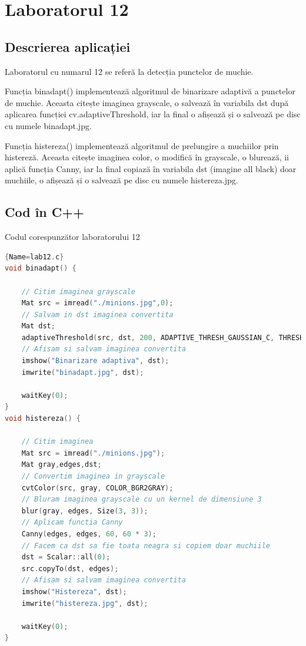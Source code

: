 \documentclass{amsart}
\begin{document}
\newpage
\section{Laboratorul 12}

\subsection{Descrierea aplicației}
\par
Laboratorul cu numarul 12 se referă la detecția punctelor de muchie.
\\ \par
Funcția binadapt() implementează algoritmul de binarizare adaptivă a punctelor de muchie. Aceasta citește imaginea grayscale, o salvează în variabila dst după aplicarea funcției cv.adaptiveThreshold, iar la final o afișează și o salvează pe disc cu numele binadapt.jpg.
\\ \par
Funcția histereza() implementează algoritmul de prelungire a muchiilor prin histereză. Aceasta citește imaginea color, o modifică în grayscale, o blurează, ii aplică funcția Canny, iar la final copiază în variabila dst (imagine all black) doar muchiile, o afișează și o salvează pe disc cu numele histereza.jpg.

\subsection{Cod \^{i}n C++}

Codul corespunzător laboratorului 12

\begin{lstlisting}[language=C++]{Name=lab12.c}
void binadapt() {

	// Citim imaginea grayscale
	Mat src = imread("./minions.jpg",0);
	// Salvam in dst imaginea convertita
	Mat dst;
	adaptiveThreshold(src, dst, 200, ADAPTIVE_THRESH_GAUSSIAN_C, THRESH_BINARY, 3, 2);
	// Afisam si salvam imaginea convertita
	imshow("Binarizare adaptiva", dst);
	imwrite("binadapt.jpg", dst);

	waitKey(0);
}
void histereza() {

	// Citim imaginea
	Mat src = imread("./minions.jpg");
	Mat gray,edges,dst;
	// Convertim imaginea in grayscale
	cvtColor(src, gray, COLOR_BGR2GRAY);
	// Bluram imaginea grayscale cu un kernel de dimensiune 3
	blur(gray, edges, Size(3, 3));
	// Aplicam functia Canny
	Canny(edges, edges, 60, 60 * 3);
	// Facem ca dst sa fie toata neagra si copiem doar muchiile
	dst = Scalar::all(0);
	src.copyTo(dst, edges);
	// Afisam si salvam imaginea convertita
	imshow("Histereza", dst);
	imwrite("histereza.jpg", dst);

	waitKey(0);
}
 \end{lstlisting}
\end{document}

